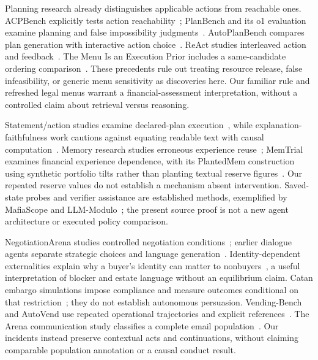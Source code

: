 Planning research already distinguishes applicable actions from reachable ones. ACPBench explicitly tests action reachability~\cite{kokel2024acp}; PlanBench and its o1 evaluation examine planning and false impossibility judgments~\cite{valmeekam2023planbench,valmeekam2024lrm}. AutoPlanBench compares plan generation with interactive action choice~\cite{stein2023autoplan}. ReAct studies interleaved action and feedback~\cite{yao2023react}. The Menu Is an Execution Prior includes a same-candidate ordering comparison~\cite{yan2026menu}. These precedents rule out treating resource release, false infeasibility, or generic menu sensitivity as discoveries here. Our familiar rule and refreshed legal menus warrant a financial-assessment interpretation, without a controlled claim about retrieval versus reasoning.

Statement/action studies examine declared-plan execution~\cite{oota2026declare}, while explanation-faithfulness work cautions against equating readable text with causal computation~\cite{turpin2023unfaithful,lanham2023faithfulness}. Memory research studies erroneous experience reuse~\cite{memory2026}; MemTrial examines financial experience dependence, with its PlantedMem construction using synthetic portfolio tilts rather than planting textual reserve figures~\cite{memtrial2026}. Our repeated reserve values do not establish a mechanism absent intervention. Saved-state probes and verifier assistance are established methods, exemplified by MafiaScope and LLM-Modulo~\cite{mafiascope2026,kambhampati2024modulo}; the present source proof is not a new agent architecture or executed policy comparison.

NegotiationArena studies controlled negotiation conditions~\cite{bianchi2024negotiationarena}; earlier dialogue agents separate strategic choices and language generation~\cite{lewis2017deal,he2018decoupling}. Identity-dependent externalities explain why a buyer's identity can matter to nonbuyers~\cite{jehiel1996externalities}, a useful interpretation of blocker and estate language without an equilibrium claim. Catan embargo simulations impose compliance and measure outcomes conditional on that restriction~\cite{guhe2014persuasion}; they do not establish autonomous persuasion. Vending-Bench and AutoVend use repeated operational trajectories and explicit references~\cite{backlund2025vendingbench,autovend2026}. The Arena communication study classifies a complete email population~\cite{li2026arena}. Our incidents instead preserve contextual acts and continuations, without claiming comparable population annotation or a causal conduct result.

